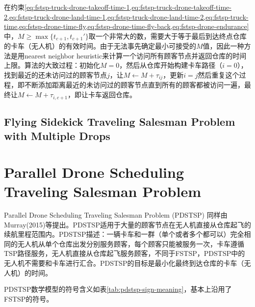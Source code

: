在约束\cref{eq:fstsp-truck-drone-takeoff-time-1,eq:fstsp-truck-drone-takeoff-time-2,eq:fstsp-truck-drone-land-time-1,eq:fstsp-truck-drone-land-time-2,eq:fstsp-truck-time,eq:fstsp-drone-time-fly,eq:fstsp-drone-time-fly-back,eq:fstsp-drone-endurance}中，$M\geq \max\{t_{c+1}, t_{c+1}'\}$取一个非常大的数，需要大于等于最后到达终点仓库的卡车（无人机）的有效时间。由于无法事先确定最小可接受的$M$值，因此一种方法是用nearest neighbor heuristic来计算一个访问所有顾客节点并返回仓库的时间上限。算法的大致过程：初始化$M = 0$，然后从仓库开始构建卡车路径（$i=0$），找到最近的还未访问过的顾客节点$j$，让$M \gets M + \tau_{ij}$，更新$i = j$然后重复这个过程，即不断添加距离最近的未访问过的顾客节点直到所有的顾客都被访问一遍，最终让$M \gets M+\tau_{i,c+1}$，即让卡车返回仓库。

\subsection{Flying Sidekick Traveling Salesman Problem with Multiple Drops}

\section{Parallel Drone Scheduling Traveling Salesman Problem}

Parallel Drone Scheduling Traveling Salesman Problem (PDSTSP) 同样由Murray(2015)等\cite{murrayFlyingSidekickTraveling2015}提出。PDSTSP适用于大量的顾客节点在无人机直接从仓库起飞的续航里程范围内。PDSTSP描述：一辆卡车和一群（单个或者多个都可以）完全相同的无人机从单个仓库出发分别服务顾客，每个顾客只能被服务一次，卡车遵循TSP路径服务，无人机直接从仓库起飞服务顾客，不同于FSTSP，PDSTSP中的无人机不需要和卡车进行汇合。PDSTSP的目标是最小化最终到达仓库的卡车（无人机）的时间。

PDSTSP数学模型的符号含义如表\ref{tab:pdstsp-sign-meaning}，基本上沿用了FSTSP的符号。

